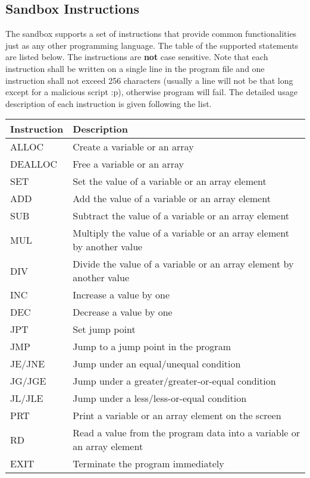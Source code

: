 \documentclass[11pt]{article}
\begin{document}
\subsection{Sandbox Instructions}
The sandbox supports a set of instructions that provide common functionalities just as any other programming language. The table of the supported statements are listed below. The instructions are {\bf not} case sensitive. Note that each instruction shall be written on a single line in the program file and one instruction shall not exceed 256 characters (usually a line will not be that long except for a malicious script :p), otherwise program will fail. The detailed usage description of each instruction is given following the list.

\begin{center}
  \begin{tabular}{| l | p{10cm} | }
    \hline
Instruction & Description \\ \hline
ALLOC &  Create a variable or an array\\ \hline 
DEALLOC & Free a variable or an array\\ \hline
SET & Set the value of a variable or an array element\\ \hline
ADD & Add the value of a variable or an array element\\ \hline
SUB & Subtract the value of a variable or an array element\\ \hline
MUL & Multiply the value of a variable or an array element by another value\\ \hline
DIV & Divide the value of a variable or an array element by another value\\ \hline
INC & Increase a value by one\\ \hline
DEC & Decrease a value by one\\ \hline
JPT  & Set jump point\\ \hline
JMP & Jump to a jump point in the program\\ \hline
JE/JNE  & Jump under an equal/unequal condition\\ \hline
JG/JGE   & Jump under a greater/greater-or-equal condition\\ \hline
JL/JLE    & Jump under a less/less-or-equal condition\\ \hline
PRT & Print a variable or an array element on the screen\\ \hline
RD & Read a value from the program data into a variable or an array element\\ \hline
EXIT & Terminate the program immediately\\ \hline
  \end{tabular}
\end{center}
\end{document}
